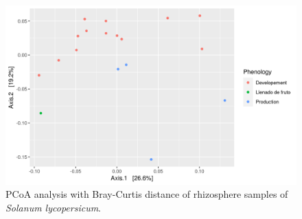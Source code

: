 \documentclass{article}
\begin{document}

















\begin{figure}
    \centering
    \includegraphics[scale = 0.7]{tomate_muestras_pcoa.png}
    \caption{PCoA analysis with Bray-Curtis distance of rhizosphere samples of \textit{Solanum lycopersicum}.}
    \label{fig:tomate_pcoa}
\end{figure}
\end{document}
